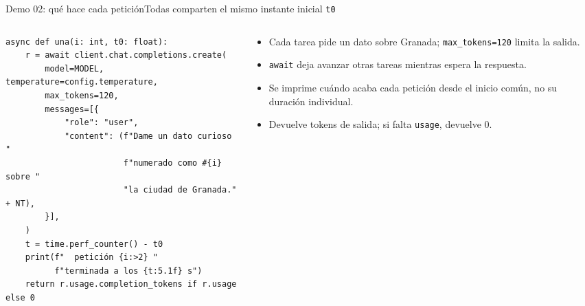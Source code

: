 \begin{frame}[fragile]{Demo 02: qué hace cada petición}{Todas comparten el mismo instante inicial \texttt{t0}}
	\begin{columns}[T]
		\begin{column}{0.58\textwidth}
			\begin{lstlisting}
async def una(i: int, t0: float):
    r = await client.chat.completions.create(
        model=MODEL, temperature=config.temperature,
        max_tokens=120,
        messages=[{
            "role": "user",
            "content": (f"Dame un dato curioso "
                        f"numerado como #{i} sobre "
                        "la ciudad de Granada." + NT),
        }],
    )
    t = time.perf_counter() - t0
    print(f"  petición {i:>2} "
          f"terminada a los {t:5.1f} s")
    return r.usage.completion_tokens if r.usage else 0
\end{lstlisting}
		\end{column}
		\begin{column}{0.4\textwidth}
			\footnotesize
			\begin{itemize}
				\item Cada tarea pide un dato sobre Granada; \texttt{max\_tokens=120} limita la salida.
				\item \texttt{await} deja avanzar otras tareas mientras espera la respuesta.
				\item Se imprime cuándo acaba cada petición desde el inicio común, no su duración individual.
				\item Devuelve tokens de salida; si falta \texttt{usage}, devuelve 0.
			\end{itemize}
		\end{column}
	\end{columns}
\end{frame}

